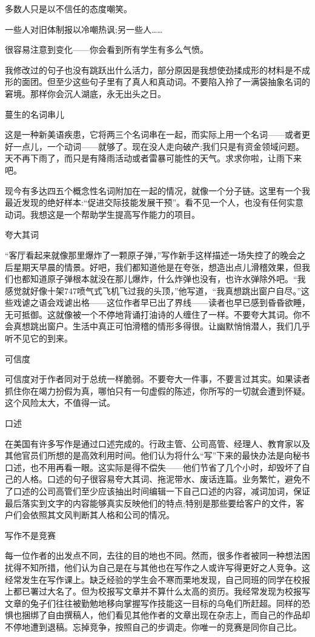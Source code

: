 多数人只是以不信任的态度嘲笑。

一些人对旧体制报以冷嘲热讽;另一些人……

很容易注意到变化——你会看到所有学生有多么气愤。

我修改过的句子也没有跳跃出什么活力，部分原因是我想使劲揉成形的材料是不成形的面团。但至少这些句子里有了真人和真动词。不要陷入拎了一满袋抽象名词的窘境。那样你会沉人湖底，永无出头之日。

蔓生的名词串儿

这是一种新美语疾患，它将两三个名词串在一起，而实际上用一个名词——或者更好一点儿，一个动词——就够了。现在没人走向破产;我们只是有资金领域问题。天不再下雨了，而只是有降雨活动或者雷暴可能性的天气。求求你啦，让雨下来吧。

现今有多达四五个概念性名词附加在一起的情况，就像一个分子链。这里有一个我最近发现的绝好样本:“促进交际技能发展干预”。看不见一个人，也没有任何实意动词。我想这是一个帮助学生提高写作能力的项目。

夸大其词

“客厅看起来就像那里爆炸了一颗原子弹，”写作新手这样描述一场失控了的晚会之后星期天早晨的情景。好吧，我们都知道他是在夸张，想造出点儿滑稽效果，但我们也都知道原子弹根本就没在那儿爆炸，什么炸弹也没有，也许水弹除外吧。“我感觉就好像十架747喷气式飞机飞过我的头顶，”他写道，“我真想跳出窗户自尽。”这些戏谑之语会戏谑出格——这位作者早已出了界线——读者也早已感到昏昏欲睡，无可抵御。这就像被一个不停地背诵打油诗的人缠住了一样。不要夸大其词。你不会真想跳出窗户。生活中真正可怕滑稽的情形多得很。让幽默悄悄潜人，我们几乎听不见它的到来。

可信度

可信度对于作者同对于总统一样脆弱。不要夸大一件事，不要言过其实。如果读者抓住你在竭力扮假为真，哪怕只有一句虚假的陈述，你所写的一切就会遭到怀疑。这个风险太大，不值得一试。

口述

在美国有许多写作是通过口述完成的。行政主管、公司高管、经理人、教育家以及其他官员们所想的是高效利用时间。他们认为将什么“写”下来的最快办法是向秘书口述，也不用再看一眼。这实际是得不偿失——他们节省了几个小时，却毁坏了自己的人格。口述的句子很容易夸大其词、拖泥带水、废话连篇。业务繁忙，避免不了口述的公司高管们至少应该抽出时间编辑一下自己口述的内容，减词加词，保证最后落实到文字的内容能够真实反映他们的特点;特别是那些要给客户的文件，客户们会依照其文风判断其人格和公司的情况。

写作不是竞赛

每一位作者的出发点不同，去往的目的地也不同。然而，很多作者被同一种想法困扰得不知所措，他们认为自己是在与其他也在写作之人或许写得更好之人竞争。这经常发生在写作课上。缺乏经验的学生会不寒而栗地发现，自己同班的同学在校报上都已署过大名了。但为校报写文章并不算什么太高的资历。我经常发现为校报写文章的兔子们往往被勤勉地移向掌握写作技能这一目标的乌龟们所赶超。同样的恐惧也捆绑了自由撰稿人，他们看见其他作者的文章出现在杂志上，而自己的作品却不停地遭到退稿。忘掉竞争，按照自己的步调走。你唯一的竞赛是同你自己比。

